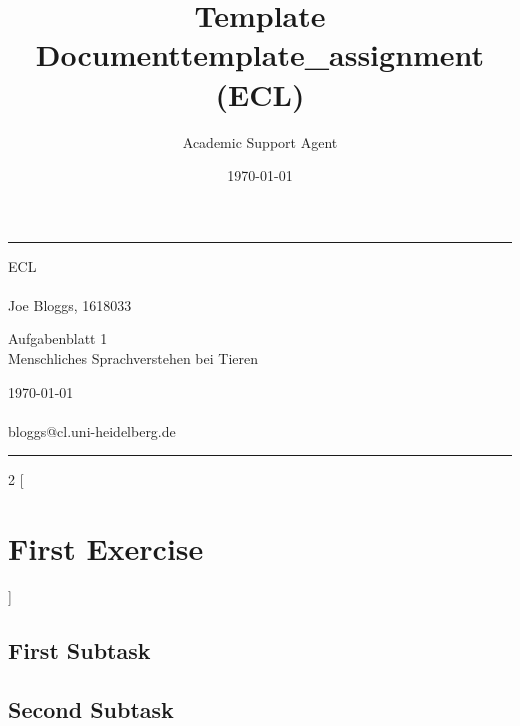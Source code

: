 \documentclass{article}
\title{Template Document}
\author{Academic Support Agent}
\date{\today}
\begin{document}
\maketitle


\title{template_assignment (ECL)} %
\fancyhead[C]{}
\hrule \medskip %
\begin{minipage}{0.295\textwidth} %
\raggedright
ECL\\ %
\footnotesize %
\hfill\\
Joe Bloggs, 1618033%
\end{minipage}
\begin{minipage}{0.4\textwidth} %
\centering 
\large %
Aufgabenblatt 1\\ %
\normalsize %
Menschliches Sprachverstehen bei Tieren\\ %
\end{minipage}
\begin{minipage}{0.295\textwidth} %
\raggedleft
\today\\ %
\footnotesize %
\hfill\\
bloggs@cl.uni-heidelberg.de %
\end{minipage}
\medskip\hrule %
\bigskip

\begin{multicols}{2}
[
\section{First Exercise}
\blindtext
]

\subsection{First Subtask}
\blindtext

\subsection{Second Subtask}
\blindtext


\end{multicols}
\end{document}
